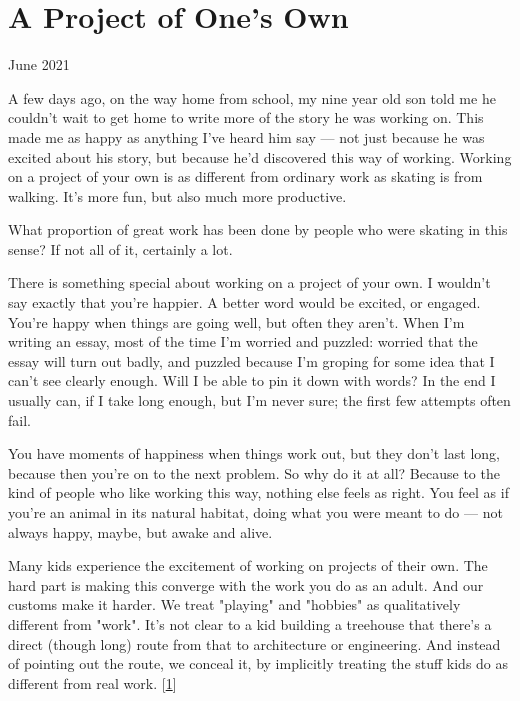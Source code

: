 \chapter{A Project of One's Own}


            
              
                

June 2021

A few days ago, on the way home from
                  school, my nine year old son told me he couldn't wait to get
                  home to write more of the story he was working on. This made
                  me as happy as anything I've heard him say --- not just
                  because he was excited about his story, but because he'd
                  discovered this way of working. Working on a project of your
                  own is as different from ordinary work as skating is from
                  walking. It's more fun, but also much more productive.

What
                  proportion of great work has been done by people who were
                  skating in this sense? If not all of it, certainly a lot.

There
                  is something special about working on a project of your own. I
                  wouldn't say exactly that you're happier. A better word would
                  be excited, or engaged. You're happy when things are going
                  well, but often they aren't. When I'm writing an essay, most
                  of the time I'm worried and puzzled: worried that the essay
                  will turn out badly, and puzzled because I'm groping for some
                  idea that I can't see clearly enough. Will I be able to pin it
                  down with words? In the end I usually can, if I take long
                  enough, but I'm never sure; the first few attempts often
                  fail.

You have moments of happiness when things
                  work out, but they don't last long, because then you're on to
                  the next problem. So why do it at all? Because to the kind of
                  people who like working this way, nothing else feels as right.
                  You feel as if you're an animal in its natural habitat, doing
                  what you were meant to do --- not always happy, maybe, but
                  awake and alive.

Many kids experience the
                  excitement of working on projects of their own. The hard part
                  is making this converge with the work you do as an adult. And
                  our customs make it harder. We treat "playing" and "hobbies"
                  as qualitatively different from "work". It's not clear to a
                  kid building a treehouse that there's a direct (though long)
                  route from that to architecture or engineering. And instead of
                  pointing out the route, we conceal it, by implicitly treating
                  the stuff kids do as different from real work.
                  [\href{\#f1n}{1}]

